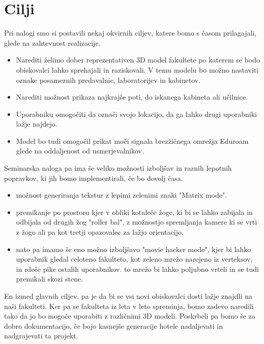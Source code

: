 \documentclass[10pt,a4paper]{article}
\begin{document}
\section{Cilji}
Pri nalogi smo si postavili nekaj okvirnih ciljev, katere bomo s časom prilagajali, glede na zahtevnost realizacije.
\begin{itemize}
	\item Narediti želimo dober reprezentativen 3D model fakultete po katerem se bodo obiskovalci lahko sprehajali in raziskovali. V temu modelu bo možno nastaviti oznake posameznih predavalnic, laboratorijev in kabinetov.
	\item Narediti možnost prikaza najkrajše poti, do iskanega kabineta ali učilnice.
	\item Uporabniku omogočiti da označi svojo lokacijo, da ga lahko drugi uporabniki lažje najdejo.
	\item Model bo tudi omogočil prikat moči signala brezžičnega omrežja Eduroam glede na oddaljenost od usmerjevalnikov.
\end{itemize}
Seminarska naloga pa ima še veliko možnosti izboljšav in raznih lepotnih popravkov, ki jih bomo implementirali, če bo dovolj časa.
\begin{itemize}
	\item možnost generiranja tekstur z lepimi zelenimi znaki "Matrix mode".
	\item premikanje po prostoru kjer v obliki kotaleče žoge, ki bi se lahko zabijala in odbijala od drugih žog "roller bal", z možnostjo spremljanja kamere ki se vrti z žogo ali pa kot tretji opazovalec za lažjo orientacijo.
	\item nato pa imamo še eno možno izboljšavo "movie hacker mode", kjer bi lahko uporabnik gledal celoteno fakulteto, kot zeleno mrežo narejeno iz verteksov, in rdeče pike ostalih uporabnikov. to mrežo bi lahko poljubno vrteli in se tudi premikali skozi stene.
\end{itemize}
En izmed glavnih ciljev, pa je da bi se vsi novi obiskovalci dosti lažje znajdli na naši fakulteti. Ker pa se fakulteta iz leta v leto spreminja, bomo zadevo naredili tako da jo bo mogoče uporabiti z različnimi 3D modeli. Poskrbeli pa bomo še za dobro dokumentacijo, če bojo kasnejše generacije hotele nadaljevati in nadgrajevati ta projekt.
\end{document}
